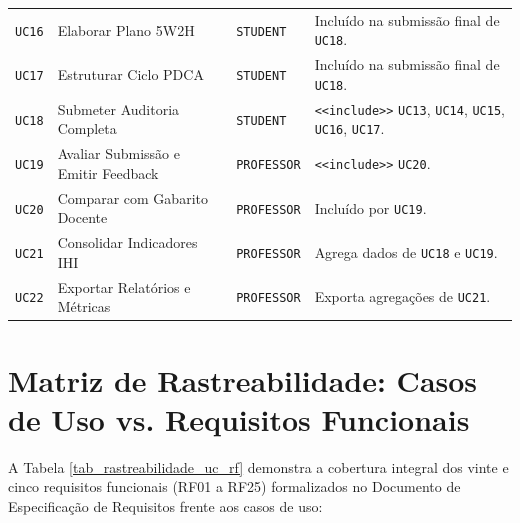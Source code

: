 \begin{table}[!ht]
\begin{tabularx}{\textwidth}{p{2.2cm} p{4.2cm} p{2.2cm} X}
\texttt{UC16} & Elaborar Plano 5W2H & \texttt{STUDENT} & Incluído na submissão final de \texttt{UC18}. \\
\texttt{UC17} & Estruturar Ciclo PDCA & \texttt{STUDENT} & Incluído na submissão final de \texttt{UC18}. \\
\texttt{UC18} & Submeter Auditoria Completa & \texttt{STUDENT} & \texttt{<<include>>} \texttt{UC13}, \texttt{UC14}, \texttt{UC15}, \texttt{UC16}, \texttt{UC17}. \\
\texttt{UC19} & Avaliar Submissão e Emitir Feedback & \texttt{PROFESSOR} & \texttt{<<include>>} \texttt{UC20}. \\
\texttt{UC20} & Comparar com Gabarito Docente & \texttt{PROFESSOR} & Incluído por \texttt{UC19}. \\
\texttt{UC21} & Consolidar Indicadores IHI & \texttt{PROFESSOR} & Agrega dados de \texttt{UC18} e \texttt{UC19}. \\
\texttt{UC22} & Exportar Relatórios e Métricas & \texttt{PROFESSOR} & Exporta agregações de \texttt{UC21}. \\
\bottomrule
\end{tabularx}
\end{table}

\section{Matriz de Rastreabilidade: Casos de Uso vs. Requisitos Funcionais}
\label{sec_matriz_uc_rf}

A Tabela \ref{tab_rastreabilidade_uc_rf} demonstra a cobertura integral dos vinte e cinco requisitos funcionais (RF01 a RF25) formalizados no Documento de Especificação de Requisitos frente aos casos de uso:

